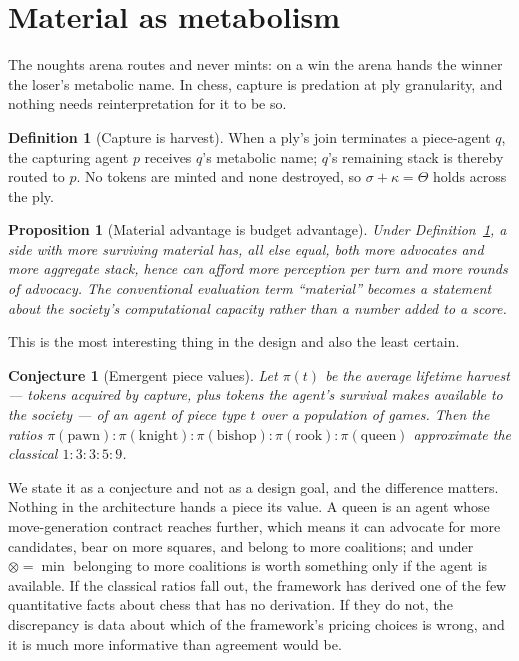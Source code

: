 \documentclass[11pt,a4paper]{article}
\theoremstyle{plain}
\newtheorem{proposition}[theorem]{Proposition}
\newtheorem{conjecture}[theorem]{Conjecture}
\theoremstyle{definition}
\newtheorem{definition}[theorem]{Definition}
\theoremstyle{remark}
\begin{document}
\section{Material as metabolism}
\label{sec:material}

The noughts arena routes and never mints: on a win the arena hands the winner the
loser's metabolic name. In chess, capture is predation at ply granularity, and
nothing needs reinterpretation for it to be so.

\begin{definition}[Capture is harvest]
\label{def:harvest}
When a ply's join terminates a piece-agent $q$, the capturing agent $p$ receives
$q$'s metabolic name; $q$'s remaining stack is thereby routed to $p$. No tokens
are minted and none destroyed, so $\sigma + \kappa = \Theta$ holds across the
ply.
\end{definition}

\begin{proposition}[Material advantage is budget advantage]
\label{prop:matbudget}
Under Definition~\ref{def:harvest}, a side with more surviving material has, all
else equal, both more advocates and more aggregate stack, hence can afford more
perception per turn and more rounds of advocacy. The conventional evaluation
term ``material'' becomes a statement about the society's computational capacity
rather than a number added to a score.
\end{proposition}

This is the most interesting thing in the design and also the least certain.

\begin{conjecture}[Emergent piece values]
\label{conj:values}
Let $\pi(t)$ be the average lifetime harvest --- tokens acquired by capture,
plus tokens the agent's survival makes available to the society --- of an agent
of piece type $t$ over a population of games. Then the ratios
$\pi(\text{pawn}) : \pi(\text{knight}) : \pi(\text{bishop}) :
\pi(\text{rook}) : \pi(\text{queen})$ approximate the classical
$1 : 3 : 3 : 5 : 9$.
\end{conjecture}

We state it as a conjecture and not as a design goal, and the difference matters.
Nothing in the architecture hands a piece its value. A queen is an agent whose
move-generation contract reaches further, which means it can advocate for more
candidates, bear on more squares, and belong to more coalitions; and under
$\otimes = \min$ belonging to more coalitions is worth something only if the
agent is available. If the classical ratios fall out, the framework has derived
one of the few quantitative facts about chess that has no derivation. If they do
not, the discrepancy is data about which of the framework's pricing choices is
wrong, and it is much more informative than agreement would be.
\end{document}
